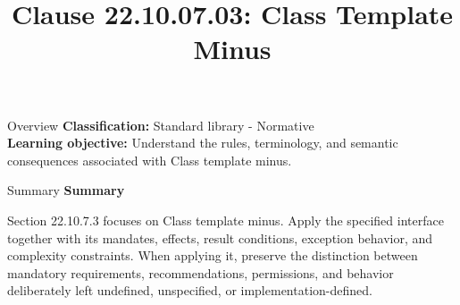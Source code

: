 \documentclass[10pt,letterpaper]{article}
\title{Clause 22.10.07.03: Class Template Minus}
\author{}
\date{}
\begin{document}
\maketitle
\begin{CornellOverviewBox}{Overview}
\textbf{Classification:} Standard library - Normative\\[2pt]
\textbf{Learning objective:} Understand the rules, terminology, and semantic consequences associated with Class template minus.
\end{CornellOverviewBox}\begin{CornellSummaryBox}{Summary}
{\sffamily\bfseries\color{Accent} Summary}\par\vspace{3pt}Section 22.10.7.3 focuses on Class template minus. Apply the specified interface together with its mandates, effects, result conditions, exception behavior, and complexity constraints. When applying it, preserve the distinction between mandatory requirements, recommendations, permissions, and behavior deliberately left undefined, unspecified, or implementation-defined.
\end{CornellSummaryBox}
\end{document}
